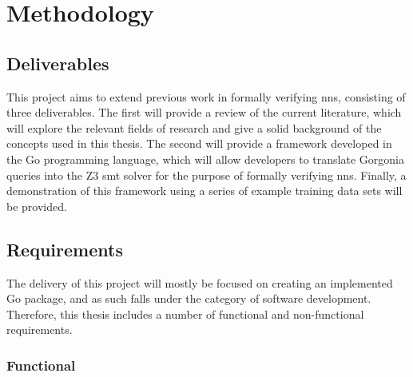 \chapter{Methodology}\label{Chapter3} %



\section{Deliverables}

This project aims to extend previous work in formally verifying \glspl{nn}, consisting
of three deliverables. The first will provide a review of the current literature, which will
explore the relevant fields of research and give a solid background of the concepts used in this thesis.
The second will provide a framework developed in the Go programming language, which will allow
developers to translate Gorgonia queries into the Z3 \gls{smt} solver for the purpose of formally
verifying \glspl{nn}. Finally, a demonstration of this framework using a series of example training data sets will be provided.


\section{Requirements}

The delivery of this project will mostly be focused on creating an implemented
Go package, and as such falls under the category of software development. Therefore, this
thesis includes a number of functional and non-functional requirements.

\subsection{Functional}

